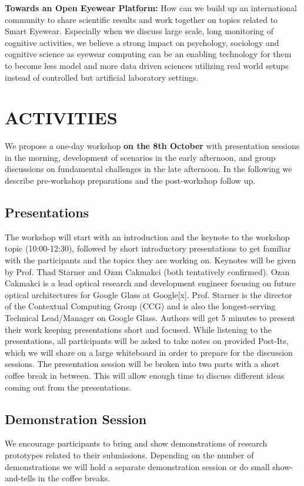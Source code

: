 \documentclass{sigchi-ext}
\begin{document}
{\bf Towards an Open Eyewear Platform:} How can we build up an international community to share scientific results and work together on topics related to Smart Eyewear. Especially when we discuss large scale, long monitoring of cognitive activities, we believe a strong impact on psychology, sociology and cognitive science as eyewear computing can be an enabling technology for them to  become less model and more data driven sciences utilizing real world setups instead of controlled but artificial laboratory settings.

\section{ACTIVITIES}
We propose a one-day workshop {\bf on the 8th October} with presentation sessions in the morning, development of scenarios in the early afternoon, and group discussions on fundamental challenges in the late afternoon. In the following we describe pre-workshop preparations and the post-workshop follow up.

\subsection{Presentations}
The workshop will start with an introduction and the keynote to the workshop topic (10:00-12:30), followed by short introductory presentations to get familiar with the participants and the topics they are working on. 
Keynotes will be given by Prof. Thad Starner and Ozan Cakmakci (both  tentatively confirmed). Ozan Cakmakci is a lead optical research and development engineer focusing on future optical architectures for Google Glass at Google[x]. Prof. Starner is the director of the Contextual Computing Group (CCG) and is also the longest-serving Technical Lead/Manager on Google Glass. 
Authors will get 5 minutes to present their work keeping presentations short and focused. While listening to the presentations, all participants will be asked to take notes on provided Post-Its, which we will share on a large whiteboard in order to prepare for the discussion sessions.
The presentation session will be broken into two parts with a short coffee break in between. This will allow enough time to discuss different ideas coming out from the presentations.

\subsection{Demonstration Session}
We encourage participants to bring and show demonstrations of research prototypes related to their submissions. Depending on the number of demonstrations we will hold a separate demonstration session or do small show-and-tells in the coffee breaks.
\end{document}
